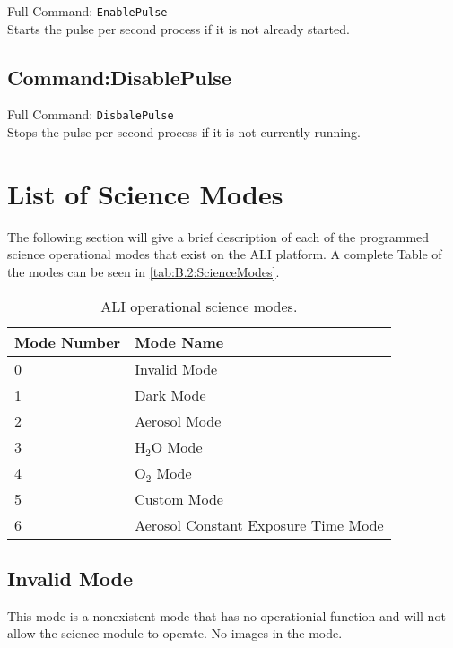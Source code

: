 Full Command: \texttt{EnablePulse}\\

Starts the pulse per second process if it is not already started.

\subsection{Command:DisablePulse}

Full Command: \texttt{DisbalePulse}\\

Stops the pulse per second process if it is not currently running.

\section{List of Science Modes}
\label{sec:B.2:ScienceModes}

The following section will give a brief description of each of the programmed science operational modes that exist on the ALI platform. A complete Table of the modes can be seen in \autoref{tab:B.2:ScienceModes}.

\begin{table}
    \begin{center}
    \begin{tabular}{|l|l|}
    \hline
    Mode Number & Mode Name \\
    \hline
    0 & Invalid Mode \\
    \hline
    1 & Dark Mode \\
    \hline
    2 & Aerosol Mode \\
    \hline
    3 & H$_{2}$O Mode \\
    \hline
    4 & O$_{2}$ Mode \\
    \hline
    5 & Custom Mode \\
    \hline
    6 & Aerosol Constant Exposure Time Mode \\
    \hline
    \end{tabular}
    \end{center}
    \caption[ALI Operational Science Modes]{ALI operational science modes.}
    \label{tab:B.2:ScienceModes}
\end{table}

\subsection{Invalid Mode}

This mode is a nonexistent mode that has no operationial function and will not allow the science module to operate. No images in the mode.

